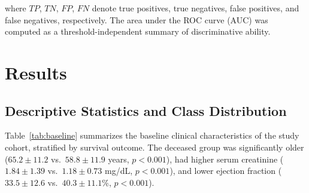 \documentclass[12pt, a4paper]{article}
\begin{document}
where $TP$, $TN$, $FP$, $FN$ denote true positives, true negatives, false 
positives, and false negatives, respectively. The area under the ROC curve 
(AUC) was computed as a threshold-independent summary of discriminative 
ability.

\section{Results}
\label{sec:results}

\subsection{Descriptive Statistics and Class Distribution}

Table~\ref{tab:baseline} summarizes the baseline clinical characteristics 
of the study cohort, stratified by survival outcome. The deceased group was 
significantly older ($65.2 \pm 11.2$ vs.\ $58.8 \pm 11.9$ years, 
$p < 0.001$), had higher serum creatinine ($1.84 \pm 1.39$ vs.\ 
$1.18 \pm 0.73$ mg/dL, $p < 0.001$), and lower ejection fraction 
($33.5 \pm 12.6$ vs.\ $40.3 \pm 11.1$\%, $p < 0.001$).
\end{document}
